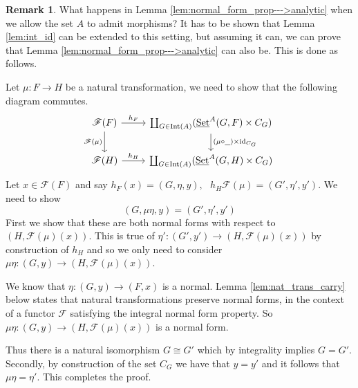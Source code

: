 \documentclass[12pt]{article}
\theoremstyle{plain}
\theoremstyle{definition}
\newtheorem{remark}[thm]{Remark}
\newcommand{\scr}[1]{\mathscr{#1}}
\newcommand{\und}[1]{\underline{\hspace{#1 cm}}}
\newcommand{\lto}{\longrightarrow}
\newcommand{\set}{\operatorname{\underline{Set}}}
\begin{document}
	\begin{remark}
		What happens in Lemma \ref{lem:normal_form_prop--->analytic} when we allow the set $A$ to admit morphisms? It has to be shown that Lemma \ref{lem:int_id} can be extended to this setting, but assuming it can, we can prove that Lemma \ref{lem:normal_form_prop--->analytic} can also be. This is done as follows.
		
		Let $\mu: F \lto H$ be a natural transformation, we need to show that the following diagram commutes.
		\begin{equation}
			\begin{tikzcd}
				\scr{F}(F)\arrow[d, swap,"{\scr{F}(\mu)}"]\arrow[r,"{h_F}"] & \coprod_{G \in \operatorname{Int}(A)}(\set^A(G,F) \times C_G)\arrow[d,"{(\mu \circ \und{0.2}) \times \operatorname{id}_{C_G}}"]\\
				\scr{F}(H)\arrow[r,"{h_H}"] & \coprod_{G \in \operatorname{Int}(A)}(\set^A(G,H) \times C_G)
			\end{tikzcd}
		\end{equation}
		Let $x \in \scr{F}(F)$ and say $h_F(x) = (G, \eta, y), \text{ } h_H\scr{F}(\mu) = (G',\eta',y')$. We need to show
		\begin{equation}
			(G, \mu \eta, y) = (G', \eta', y')
		\end{equation}
	First we show that these are both normal forms with respect to $(H, \scr{F}(\mu)(x))$. This is true of $\eta': (G', y') \lto (H,\scr{F}(\mu)(x))$ by construction of $h_H$ and so we only need to consider $\mu \eta: (G,y) \lto (H, \scr{F}(\mu)(x))$.
	
	We know that $\eta: (G, y) \lto (F, x)$ is a normal. Lemma \ref{lem:nat_trans_carry} below states that natural transformations preserve normal forms, in the context of a functor $\scr{F}$ satisfying the integral normal form property. So $\mu\eta: (G, y) \lto (H, \scr{F}(\mu)(x))$ is a normal form.
	
	Thus there is a natural isomorphism $G \cong G'$ which by integrality implies $G = G'$. Secondly, by construction of the set $C_G$ we have that $y = y'$ and it follows that $\mu\eta = \eta'$. This completes the proof.
		\end{remark}
	
\end{document}
